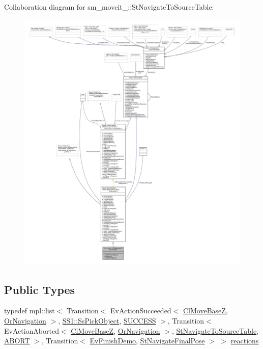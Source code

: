 Collaboration diagram for sm\+\_\+moveit\+\_\+:\+:St\+Navigate\+To\+Source\+Table\+:
\nopagebreak
\begin{figure}[H]
\begin{center}
\leavevmode
\includegraphics[width=350pt]{structsm__moveit__4_1_1StNavigateToSourceTable__coll__graph}
\end{center}
\end{figure}
\subsection*{Public Types}
\begin{DoxyCompactItemize}
\item 
typedef mpl\+::list$<$ Transition$<$ Ev\+Action\+Succeeded$<$ \hyperlink{classcl__move__base__z_1_1ClMoveBaseZ}{Cl\+Move\+BaseZ}, \hyperlink{classsm__moveit__4_1_1OrNavigation}{Or\+Navigation} $>$, \hyperlink{structsm__moveit__4_1_1SS1_1_1SsPickObject}{S\+S1\+::\+Ss\+Pick\+Object}, \hyperlink{classSUCCESS}{S\+U\+C\+C\+E\+SS} $>$, Transition$<$ Ev\+Action\+Aborted$<$ \hyperlink{classcl__move__base__z_1_1ClMoveBaseZ}{Cl\+Move\+BaseZ}, \hyperlink{classsm__moveit__4_1_1OrNavigation}{Or\+Navigation} $>$, \hyperlink{structsm__moveit__4_1_1StNavigateToSourceTable}{St\+Navigate\+To\+Source\+Table}, \hyperlink{classABORT}{A\+B\+O\+RT} $>$, Transition$<$ \hyperlink{structsm__moveit__4_1_1EvFinishDemo}{Ev\+Finish\+Demo}, \hyperlink{structsm__moveit__4_1_1StNavigateFinalPose}{St\+Navigate\+Final\+Pose} $>$ $>$ \hyperlink{structsm__moveit__4_1_1StNavigateToSourceTable_ae1b19f752700392a40f225b02d677571}{reactions}
\end{DoxyCompactItemize}
